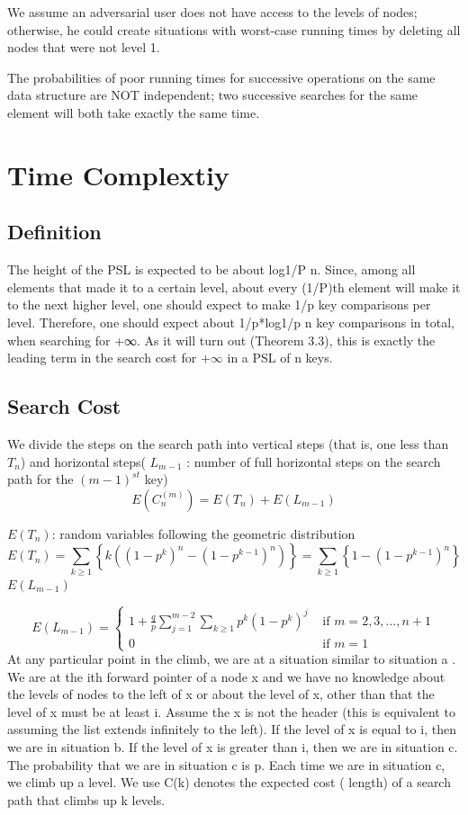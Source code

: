 \documentclass[10pt,english, openany]{book}
\begin{document}
We assume an adversarial user does not have access to the levels of nodes; otherwise, he could create situations with worst-case running times by deleting all nodes that were not level 1. 

The probabilities of poor running times for successive operations on the same data structure are NOT independent; two successive searches for the same element will both take exactly the same time.
\section{Time Complextiy}
\subsection{Definition}
The height of the PSL is expected to be about log1/P n. Since, among all elements that made it to a certain level, about every (1/P)th element will make it to the next higher level, one should expect to make 1/p key comparisons per level. Therefore, one should expect about 1/p*log1/p n key comparisons in total, when searching for +∞. As it will turn out (Theorem 3.3), this is exactly the leading term in the search cost for $+\infty$ in a PSL of n keys.
\subsection{Search Cost}
We divide the steps on the search path into vertical steps (that is, one less than $T_n$) and horizontal steps( $L_{m-1}$ : number of full horizontal steps on the search path for the $(m-1)^{st}$ key)
\[
E\left(C_{n}^{(m)}\right)=E\left(T_{n}\right)+E\left(L_{m-1}\right)
\]

$E(T_n)$: random variables following the geometric distribution
\[
E\left(T_{n}\right)=\sum_{k \geq 1}\left\{k\left(\left(1-p^{k}\right)^{n}-\left(1-p^{k-1}\right)^{n}\right)\right\}=\sum_{k \geq 1}\left\{1-\left(1-p^{k-1}\right)^{n}\right\}
\]
$E(L_{m-1})$

\[
E\left(L_{m-1}\right)=\left\{\begin{array}{ll}
1+\frac{q}{p} \sum_{j=1}^{m-2} \sum_{k \geq 1} p^{k}\left(1-p^{k}\right)^{j} & \text { if } m=2,3, \ldots, n+1 \\
0 & \text { if } m=1
\end{array}\right.
\]
At any particular point in the climb, we are at a situation similar to situation a . We are at the ith forward pointer of a node x and we have no knowledge about the levels of nodes to the left of x or about the level of x, other than that the level of x must be at least i. Assume the x is not the header (this is equivalent to assuming the list extends infinitely to the left). If the level of x is equal to i, then we are in situation b. If the level of x is greater than i, then we are in situation c. The probability that we are in situation c is p. Each time we are in situation c, we climb up a level. We use C(k) denotes the expected cost ( length) of a search path that climbs up k levels.
\end{document}
